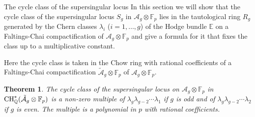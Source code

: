 \documentclass[11pt]{amsart}
\numberwithin{equation}{section}
\newcommand{\EE}{\mathbb E}
\newcommand{\FF}{\mathbb F}
\newcommand{\QQ}{\mathbb Q}
\newtheorem{theorem}{Theorem}[section]
\theoremstyle{definition}
\theoremstyle{remark}
\begin{document}
\begin{section}{The cycle class of the supersingular locus}\label{class-section}
In this section we will show that the 
cycle class of the supersingular 
locus $S_g$ in $\mathcal{A}_g\otimes {\FF}_p$ lies in the
tautological ring $R_g$ generated by the Chern classes $\lambda_i$ 
($i=1,\ldots,g$) of the Hodge
bundle ${\EE}$ 
on a Faltings-Chai compactification of $\mathcal{A}_g\otimes {\FF}_p$ and give a formula for it that fixes the class
up to a multiplicative constant.  

Here the cycle class is taken
in the Chow ring with rational coefficients 
of a Faltings-Chai compactification 
$\tilde{\mathcal{A}}_g \otimes {\FF}_p$ of $\mathcal{A}_g \otimes {\FF}_p$.


\begin{theorem}\label{NPlociThm}
The cycle class of the supersingular locus on
$\mathcal{A}_g\otimes {\FF}_p$ in ${\rm CH}_{\QQ}^{*}(\tilde{\mathcal{A}}_g\otimes {\FF}_p)$
is a non-zero
multiple of $\lambda_g \lambda_{g-2} \cdots \lambda_{1}$ if $g$ is odd
and of  $\lambda_g \lambda_{g-2} \cdots \lambda_{2}$ if $g$ is even. 
The multiple is a polynomial in $p$ with rational coefficients.
\end{theorem}


\end{section}
\end{document}
